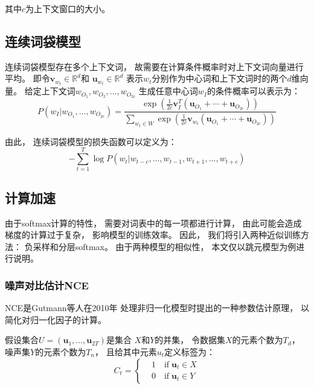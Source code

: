 其中$c$为上下文窗口的大小。

\subsection{连续词袋模型}

连续词袋模型存在多个上下文词，
故需要在计算条件概率时对上下文词向量进行平均。
即令$\mathbf{v}_{w_t}\in\mathbb{R}^d$和
$\mathbf{u}_{w_t}\in\mathbb{R}^d$
表示$w_t$分别作为中心词和上下文词时的两个$d$维向量。
给定上下文词$w_{O_1}, w_{O_2}, \ldots, w_{O_{2c}}$
生成任意中心词$w_I$的条件概率可以表示为：
\begin{equation}
    P\left(w_I|w_{O_1}, \ldots, w_{O_{2c}}\right) = \frac{\exp\left(\frac{1}{2c}\mathbf{v}_I^T\left(\mathbf{u}_{O_1}+\cdots+\mathbf{u}_{O_{2c}}\right)\right)}{\sum_{w_t\in W}\exp\left(\frac{1}{2c}\mathbf{v}_{w_t}\left(\mathbf{u}_{O_1}+\cdots+\mathbf{u}_{O_{2c}}\right)\right)}
\end{equation}

由此，
连续词袋模型的损失函数可以定义为：
\begin{equation}
    -\sum_{t=1}^T\log P\left(w_t|w_{t-c}, \ldots, w_{t-1}, w_{t+1}, \ldots, w_{t+c}\right)
\end{equation}

\subsection{计算加速}

由于softmax计算的特性，
需要对词表中的每一项都进行计算，
由此可能会造成梯度的计算过于复杂，
影响模型的训练效率。
因此，
我们将引入两种近似训练方法：
负采样和分层softmax。
由于两种模型的相似性，
本文仅以跳元模型为例进行说明。

\subsubsection{噪声对比估计NCE}

NCE是Gutmann等人在2010年\cite{gutmannNoisecontrastiveEstimationNew2010}
处理非归一化模型时提出的一种参数估计原理，
以简化对归一化因子的计算。

假设集合$U=\left(\mathbf{u}_1, \ldots, \mathbf{u}_{2T}\right)$是集合
$X$和$Y$的并集，
令数据集$X$的元素个数为$T_d$，
噪声集$Y$的元素个数为$T_n$，
且给其中元素$u_t$定义标签为：
\begin{equation}
    C_t = \left\{
    \begin{aligned}
         & 1 \quad \text{if} \; \mathbf{u}_t \in X \\
         & 0 \quad \text{if} \; \mathbf{u}_t \in Y
    \end{aligned}
    \right.
\end{equation}


